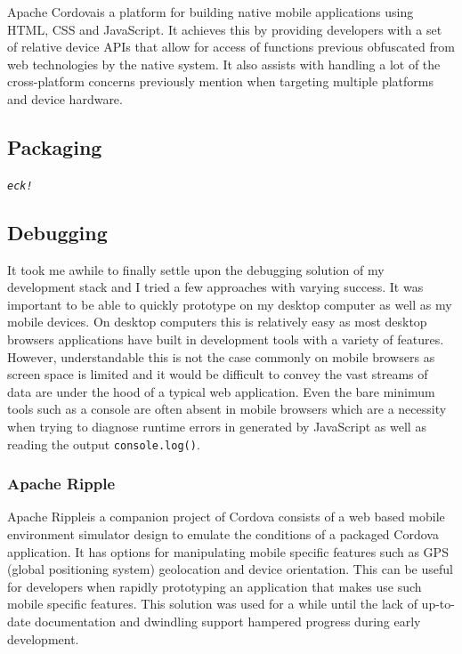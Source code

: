 \documentclass[final]{cmpreport}
\begin{document}
{

Apache Cordova\footnotemark[35] is a platform for building native mobile applications using HTML, CSS and JavaScript. It achieves this by providing developers with a set of relative device APIs that allow for access of functions previous obfuscated from web technologies by the native system. It also assists with handling a lot of the cross-platform concerns previously mention when targeting multiple platforms and device hardware.


\subsection{Packaging}
\textit{\texttt{eck!}}

\subsection{Debugging}
It took me awhile to finally settle upon the debugging solution of my development stack and I tried a few approaches with varying success. It was important to be able to quickly prototype on my desktop computer as well as my mobile devices. On desktop computers this is relatively easy as most desktop browsers applications have built in development tools with a variety of features. However, understandable this is not the case commonly on mobile browsers as screen space is limited and it would be difficult to convey the vast streams of data are under the hood of a typical web application. Even the bare minimum tools such as a console are often absent in mobile browsers which are a necessity when trying to diagnose runtime errors in generated by JavaScript as well as reading the output \texttt{console.log()}.

\subsubsection{Apache Ripple}
Apache Ripple\footnotemark[36] is a companion project of Cordova consists of a web based mobile environment simulator design to emulate the conditions of a packaged Cordova application. It has options for manipulating mobile specific features such as GPS (global positioning system) geolocation and device orientation. This can be useful for developers when rapidly prototyping an application that makes use such mobile specific features. This solution was used for a while until the lack of up-to-date documentation and dwindling support hampered progress during early development.

}
\end{document}

